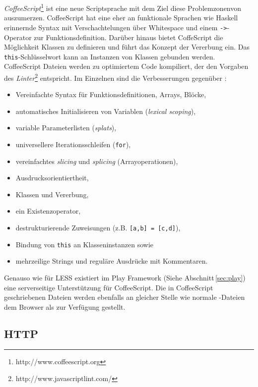 \textit{CoffeeScript}\footnote{http://www.coffeescript.org} ist eine neue Scriptsprache mit dem Ziel
diese \glqq Problemzonen\grqq von  auszumerzen. CoffeeScript hat eine eher an funktionale
Sprachen wie Haskell erinnernde Syntax mit Verschachtelungen über Whitespace und einem
\texttt{->}-Operator zur Funktionsdefinition. Darüber hinaus bietet CoffeScript die Möglichkeit
Klassen zu definieren und führt das Konzept der Vererbung ein. Das \texttt{this}-Schlüsselwort kann
an Instanzen von Klassen gebunden werden. CoffeeScript Dateien werden zu optimiertem  Code
kompiliert, der den Vorgaben des \textit{
Linter}\footnote{http://www.javascriptlint.com/} entspricht. Im Einzelnen sind die Verbesserungen
gegenüber :

\begin{itemize}
  \item Vereinfachte Syntax für Funktionsdefinitionen, Arrays, Blöcke,
  \item automatisches Initialisieren von Variablen (\textit{lexical scoping}),
  \item variable Parameterlisten (\textit{splats}),
  \item universellere Iterationsschleifen (\texttt{for}),
  \item vereinfachtes \textit{slicing} und \textit{splicing} (Arrayoperationen),
  \item Ausdrucksorientiertheit,
  \item Klassen und Vererbung,
  \item ein Existenzoperator,
  \item destrukturierende Zuweisungen (z.B. \texttt{[a,b] = [c,d]}),
  \item Bindung von \texttt{this} an Klasseninstanzen sowie
  \item mehrzeilige Strings und reguläre Ausdrücke mit Kommentaren.
\end{itemize}

Genauso wie für LESS existiert im Play Framework (Siehe Abschnitt\,\ref{sec:play}) eine serverseitige
Unterstützung  für CoffeeScript. Die in CoffeeScript geschriebenen Dateien  werden ebenfalls an
gleicher Stelle wie normale -Dateien dem  Browser als  zur Verfügung gestellt.

\subsection{HTTP}

